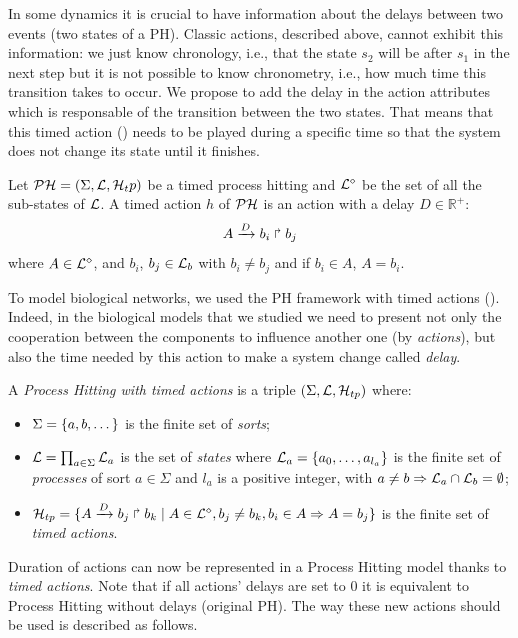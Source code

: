 In some dynamics it is crucial to have information about the delays between two events (two states of a PH). Classic actions, described above, cannot exhibit this information: we just know chronology, i.e., that the state $s_2$ will be after $s_1$ in the next step but it is not possible to know chronometry, i.e., how much time this transition takes to occur. We propose to add the delay in the action attributes which is responsable of the transition between the two states. That means that this timed action () needs to be played during a specific time so that the system does not change its state until it finishes.

\begin{definition}
\label{def:TimedAction}
Let $\mathcal{PH} = (\Sigma,\mathcal{L},\mathcal{H}_tp)$ be a timed process hitting and $\mathcal{L}^{\diamond}$ be the set of all the sub-states of $\mathcal{L}$.
A timed action $h$ of $\mathcal{PH}$ is an action with a delay $D \in \mathds{R}^+$: $$A\xrightarrow{D} b_i \Rsh b_j$$ where $A \in \mathcal{L}^{\diamond}$, and $b_i$, $b_j \in \mathcal{L}_b$ with  $b_i \not = b_j$ and if $b_i \in A$, $A=b_i$.
\end{definition}
To model biological networks, we used the PH framework with timed actions (). Indeed, in the biological models that we studied we need to present not only the cooperation between the components to influence another one (by \emph{actions}), but also the time needed by this action to make a system change called \emph{delay}. 
\begin{definition}
\label{def:PH-timed}
  A \emph{Process Hitting with timed actions} is a triple $(\Sigma,\mathcal{L},\mathcal{H}_{tp})$ where:
  \begin{itemize}
    \item  $\Sigma = \{a,b,\dots\}$ is the finite set of \emph{sorts};
    \item  $\mathcal{L} = \prod_{a\in\Sigma} \mathcal{L}_a$ is the set of \emph{states} where
      $\mathcal{L}_a = \{a_0,\dots,a_{l_a}\}$
      is the finite set of \emph{processes} of sort $a\in\Sigma$
      and $l_a$ is a positive integer, with $a\neq b\Rightarrow \mathcal{L}_a \cap \mathcal{L}_b = \emptyset$;
    \item  $\mathcal{H}_{tp} = \{ A\xrightarrow{D} b_j \Rsh b_k  \mid A \in \mathcal{L}^{\diamond}, b_j\neq b_k, b_i \in A \Rightarrow A=b_j\}$
      is the finite set of \emph{timed actions}.
  \end{itemize}
\end{definition}

Duration of actions can now be represented in a Process Hitting model thanks to \emph{timed actions}.
Note that if all actions' delays are set to $0$ it is equivalent to Process Hitting without delays (original PH).
The way these new actions should be used is described as follows.

